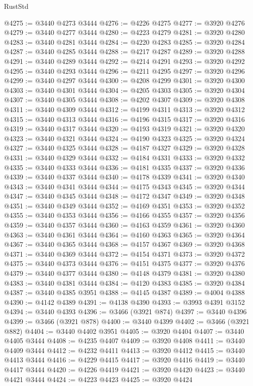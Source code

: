 \begin{lexlean}{RustStd}
\begin{coremodule}
@4275 := @3440 @4273 @3444
@4276 := @4226 @4275
@4277 := @3920 @4276
@4279 := @3440 @4277 @3444
@4280 := @4223 @4279
@4281 := @3920 @4280
@4283 := @3440 @4281 @3444
@4284 := @4220 @4283
@4285 := @3920 @4284
@4287 := @3440 @4285 @3444
@4288 := @4217 @4287
@4289 := @3920 @4288
@4291 := @3440 @4289 @3444
@4292 := @4214 @4291
@4293 := @3920 @4292
@4295 := @3440 @4293 @3444
@4296 := @4211 @4295
@4297 := @3920 @4296
@4299 := @3440 @4297 @3444
@4300 := @4208 @4299
@4301 := @3920 @4300
@4303 := @3440 @4301 @3444
@4304 := @4205 @4303
@4305 := @3920 @4304
@4307 := @3440 @4305 @3444
@4308 := @4202 @4307
@4309 := @3920 @4308
@4311 := @3440 @4309 @3444
@4312 := @4199 @4311
@4313 := @3920 @4312
@4315 := @3440 @4313 @3444
@4316 := @4196 @4315
@4317 := @3920 @4316
@4319 := @3440 @4317 @3444
@4320 := @4193 @4319
@4321 := @3920 @4320
@4323 := @3440 @4321 @3444
@4324 := @4190 @4323
@4325 := @3920 @4324
@4327 := @3440 @4325 @3444
@4328 := @4187 @4327
@4329 := @3920 @4328
@4331 := @3440 @4329 @3444
@4332 := @4184 @4331
@4333 := @3920 @4332
@4335 := @3440 @4333 @3444
@4336 := @4181 @4335
@4337 := @3920 @4336
@4339 := @3440 @4337 @3444
@4340 := @4178 @4339
@4341 := @3920 @4340
@4343 := @3440 @4341 @3444
@4344 := @4175 @4343
@4345 := @3920 @4344
@4347 := @3440 @4345 @3444
@4348 := @4172 @4347
@4349 := @3920 @4348
@4351 := @3440 @4349 @3444
@4352 := @4169 @4351
@4353 := @3920 @4352
@4355 := @3440 @4353 @3444
@4356 := @4166 @4355
@4357 := @3920 @4356
@4359 := @3440 @4357 @3444
@4360 := @4163 @4359
@4361 := @3920 @4360
@4363 := @3440 @4361 @3444
@4364 := @4160 @4363
@4365 := @3920 @4364
@4367 := @3440 @4365 @3444
@4368 := @4157 @4367
@4369 := @3920 @4368
@4371 := @3440 @4369 @3444
@4372 := @4154 @4371
@4373 := @3920 @4372
@4375 := @3440 @4373 @3444
@4376 := @4151 @4375
@4377 := @3920 @4376
@4379 := @3440 @4377 @3444
@4380 := @4148 @4379
@4381 := @3920 @4380
@4383 := @3440 @4381 @3444
@4384 := @4120 @4383
@4385 := @3920 @4384
@4387 := @3440 @4385 @3951
@4388 := @4145 @4387
@4389 := @4004 @4388
@4390 := @4142 @4389
@4391 := @4138 @4390
@4393 := @3993 @4391 @3152
@4394 := @3440 @4393
@4396 := @3466 (@3921 @874)
@4397 := @3440 @4396
@4399 := @3466 (@3921 @878)
@4400 := @3440 @4399
@4402 := @3466 (@3921 @882)
@4404 := @3440 @4402 @3951
@4405 := @3920 @4404
@4407 := @3440 @4405 @3444
@4408 := @4235 @4407
@4409 := @3920 @4408
@4411 := @3440 @4409 @3444
@4412 := @4232 @4411
@4413 := @3920 @4412
@4415 := @3440 @4413 @3444
@4416 := @4229 @4415
@4417 := @3920 @4416
@4419 := @3440 @4417 @3444
@4420 := @4226 @4419
@4421 := @3920 @4420
@4423 := @3440 @4421 @3444
@4424 := @4223 @4423
@4425 := @3920 @4424

\end{coremodule}
\end{lexlean}
